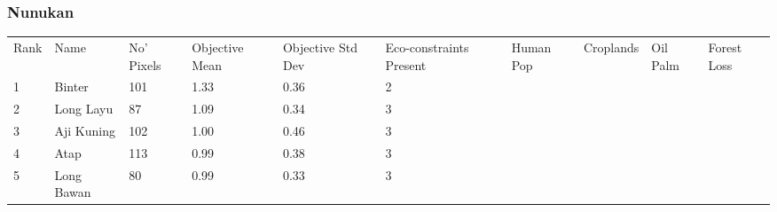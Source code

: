 \subsubsection{Nunukan}
\begin{table}[ht]
\centering
\begingroup\fontsize{9pt}{10pt}\selectfont
\begin{tabular}{C{0.05\textwidth}C{0.15\textwidth}C{0.08\textwidth}C{0.08\textwidth}C{0.08\textwidth}C{0.08\textwidth}C{0.08\textwidth}C{0.08\textwidth}C{0.08\textwidth}C{0.08\textwidth}}
 Rank & Name & No' Pixels & Objective Mean & Objective Std Dev & Eco-constraints  Present & Human Pop & Croplands & Oil Palm & Forest Loss \\ 
 {1} & Binter & 101 & \textcolor[HTML]{FFFFFF}{1.33} & \textcolor[HTML]{000000}{0.36} & \textcolor[HTML]{000000}{2} &  &  &  &  \\ 
  {2} & Long Layu &  87 & \textcolor[HTML]{FFFFFF}{1.09} & \textcolor[HTML]{000000}{0.34} & \textcolor[HTML]{000000}{3} &  &  &  &  \\ 
  {3} & Aji Kuning & 102 & \textcolor[HTML]{000000}{1.00} & \textcolor[HTML]{FFFFFF}{0.46} & \textcolor[HTML]{000000}{3} &  &  &  &  \\ 
  {4} & Atap & 113 & \textcolor[HTML]{000000}{0.99} & \textcolor[HTML]{FFFFFF}{0.38} & \textcolor[HTML]{000000}{3} &  &  &  &  \\ 
  {5} & Long Bawan &  80 & \textcolor[HTML]{000000}{0.99} & \textcolor[HTML]{000000}{0.33} & \textcolor[HTML]{000000}{3} &  &  &  &  \\ 

\end{tabular}
\end{table}
